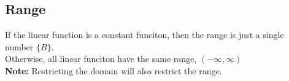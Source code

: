\documentclass{ximera}
\begin{document}
\subsection*{Range}


If the linear function is a constant funciton, then the range is just a single number $\{ B \}$. \\

Otherwise, all linear funciton have the same range, $(-\infty, \infty)$ \\

\textbf{Note:} Restricting the domain will also restrict the range.\\
\end{document}
